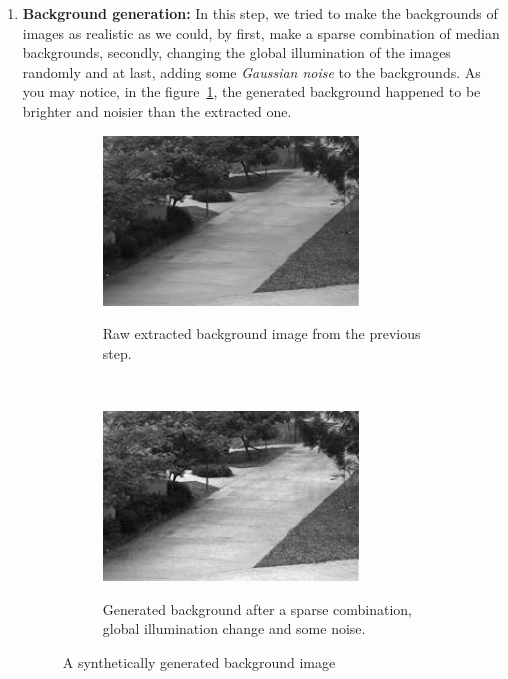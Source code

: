 \begin{enumerate}
\item \textbf{Background generation:} In this step, we tried to make the backgrounds of images as realistic as we could, by first, make a sparse combination of median backgrounds, secondly, changing the global illumination of the images randomly and at last, adding some \textit{Gaussian noise} to the backgrounds. As you may notice, in the figure~\ref{backback}, the generated background happened to be brighter and noisier than the extracted one. 

\begin{figure}[h!]
    \centering
    \begin{subfigure}[t]{0.5\textwidth}
        \centering
        {\includegraphics[width=0.8\textwidth]{images/background}}
        \caption{Raw extracted background image from the previous step.}
    \end{subfigure}%
    ~ 
    \begin{subfigure}[t]{0.5\textwidth}
        \centering
        {\includegraphics[width=0.8\textwidth]{images/background3}}
        \caption{Generated background after a sparse combination, global illumination change and some noise.}
    \end{subfigure}
    \caption{A synthetically generated background image}
    \label{backback}
\end{figure}


\end{enumerate}
